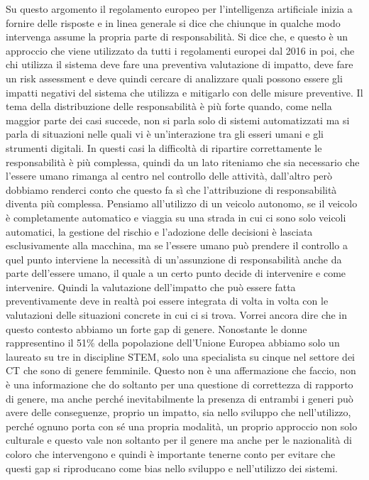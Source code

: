 Su questo argomento il regolamento europeo per l'intelligenza artificiale inizia a fornire delle risposte e in linea generale si dice che chiunque in qualche modo intervenga assume la propria parte di responsabilità. Si dice che, e questo è un approccio che viene utilizzato da tutti i regolamenti europei dal 2016 in poi, che chi utilizza il sistema deve fare una preventiva valutazione di impatto, deve fare un risk assessment e deve quindi cercare di analizzare quali possono essere gli impatti negativi del sistema che utilizza e mitigarlo con delle misure preventive.
Il tema della distribuzione delle responsabilità è più forte quando, come nella maggior parte dei casi succede, non si parla solo di sistemi automatizzati ma si parla di situazioni nelle quali vi è un'interazione tra gli esseri umani e gli strumenti digitali.
In questi casi la difficoltà di ripartire correttamente le responsabilità è più complessa, quindi da un lato riteniamo che sia necessario che l'essere umano rimanga al centro nel controllo delle attività, dall'altro però dobbiamo renderci conto che questo fa sì che l'attribuzione di responsabilità diventa più complessa.
Pensiamo all'utilizzo di un veicolo autonomo, se il veicolo è completamente automatico e viaggia su una strada in cui ci sono solo veicoli automatici, la gestione del rischio e l'adozione delle decisioni è lasciata esclusivamente alla macchina, ma se l'essere umano può prendere il controllo a quel punto interviene la necessità di un'assunzione di responsabilità anche da parte dell'essere umano, il quale a un certo punto decide di intervenire e come intervenire.
Quindi la valutazione dell'impatto che può essere fatta preventivamente deve in realtà poi essere integrata di volta in volta con le valutazioni delle situazioni concrete in cui ci si trova.
Vorrei ancora dire che in questo contesto abbiamo un forte gap di genere.
Nonostante le donne rappresentino il 51\% della popolazione dell'Unione Europea abbiamo solo un laureato su tre in discipline STEM, solo una specialista su cinque nel settore dei CT che sono di genere femminile.
Questo non è una affermazione che faccio, non è una informazione che do soltanto per una questione di correttezza di rapporto di genere, ma anche perché inevitabilmente la presenza di entrambi i generi può avere delle conseguenze, proprio un impatto, sia nello sviluppo che nell'utilizzo, perché ognuno porta con sé una propria modalità, un proprio approccio non solo culturale e questo vale non soltanto per il genere ma  anche per le nazionalità di coloro che intervengono e quindi è importante tenerne conto per evitare che questi gap si riproducano come bias nello sviluppo e nell'utilizzo dei sistemi.
